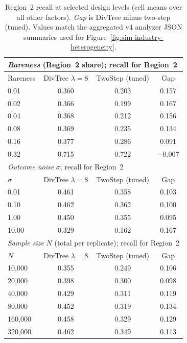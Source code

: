 \begin{table}[t!]
\centering
\footnotesize
\setlength{\tabcolsep}{4pt}
\begin{tabular}{lccc}
\toprule
\multicolumn{4}{l}{\emph{Rareness} (Region~2 share); recall for Region~2} \\
\midrule
Rareness & DivTree $\lambda{=}8$ & TwoStep (tuned) & Gap \\
\midrule
0.01 & 0.360 & 0.203 & 0.157 \\
0.02 & 0.366 & 0.199 & 0.167 \\
0.04 & 0.368 & 0.212 & 0.156 \\
0.08 & 0.369 & 0.235 & 0.134 \\
0.16 & 0.377 & 0.286 & 0.091 \\
0.32 & 0.715 & 0.722 & $-0.007$ \\
\midrule
\multicolumn{4}{l}{\emph{Outcome noise} $\sigma$; recall for Region~2} \\
\midrule
$\sigma$ & DivTree $\lambda{=}8$ & TwoStep (tuned) & Gap \\
\midrule
0.01 & 0.461 & 0.358 & 0.103 \\
0.10 & 0.462 & 0.362 & 0.100 \\
1.00 & 0.450 & 0.355 & 0.095 \\
10.00 & 0.329 & 0.162 & 0.167 \\
\midrule
\multicolumn{4}{l}{\emph{Sample size} $N$ (total per replicate); recall for Region~2} \\
\midrule
$N$ & DivTree $\lambda{=}8$ & TwoStep (tuned) & Gap \\
\midrule
10{,}000 & 0.355 & 0.249 & 0.106 \\
20{,}000 & 0.398 & 0.300 & 0.098 \\
40{,}000 & 0.429 & 0.311 & 0.119 \\
80{,}000 & 0.452 & 0.319 & 0.134 \\
160{,}000 & 0.458 & 0.329 & 0.129 \\
320{,}000 & 0.462 & 0.349 & 0.113 \\
\bottomrule
\end{tabular}
\caption{\label{tab:recall-het-by-factor}
Region~2 recall at selected design levels (cell means over all other factors). \emph{Gap} is DivTree minus two-step (tuned). Values match the aggregated v4 analyzer JSON summaries used for Figure~\ref{fig:sim-industry-heterogeneity}.}
\end{table}
